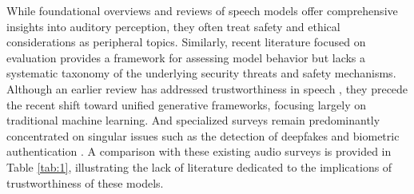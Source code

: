 \documentclass{llmxive}
\begin{document}
While foundational overviews and reviews of speech models \cite{latif2023sparks, peng2025survey, su2025audio} offer comprehensive insights into auditory perception, they often treat safety and ethical considerations as peripheral topics. Similarly, recent literature focused on evaluation provides a framework  \cite{yang2025towards} for assessing model behavior but lacks a systematic taxonomy of the underlying security threats and safety mechanisms. Although an earlier review has addressed trustworthiness in speech \cite{feng2022review}, they precede the recent shift toward unified generative frameworks, focusing largely on traditional machine learning. And specialized surveys remain predominantly concentrated on singular issues such as the detection of deepfakes and biometric authentication \cite{yi2023audio, li2025survey, pham2025comprehensive}. A comparison with these existing audio surveys is provided in Table \ref{tab:1}, illustrating the lack of literature dedicated to the implications of trustworthiness of these models.



\end{document}
